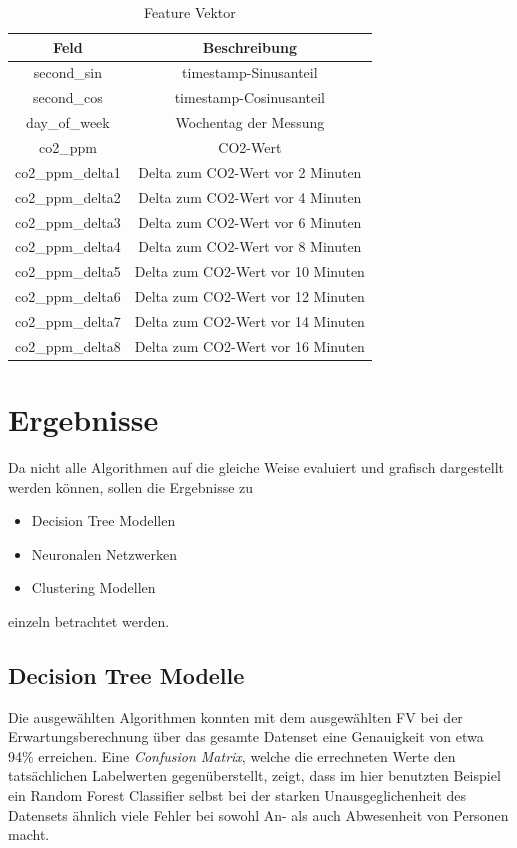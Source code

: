 \begin{center}
    \begin{table}[h]
        \centering
        \caption{Feature Vektor}
        \begin{tabular}{ |c||c| } 
        \hline
        Feld & Beschreibung \\ 
        \hline\hline
        second\_sin & timestamp-Sinusanteil\\
        second\_cos & timestamp-Cosinusanteil\\
        day\_of\_week & Wochentag der Messung\\
        co2\_ppm & CO2-Wert\\ 
        co2\_ppm\_delta1 & Delta zum CO2-Wert vor 2 Minuten\\ 
        co2\_ppm\_delta2 & Delta zum CO2-Wert vor 4 Minuten\\ 
        co2\_ppm\_delta3 & Delta zum CO2-Wert vor 6 Minuten\\ 
        co2\_ppm\_delta4 & Delta zum CO2-Wert vor 8 Minuten\\ 
        co2\_ppm\_delta5 & Delta zum CO2-Wert vor 10 Minuten\\ 
        co2\_ppm\_delta6 & Delta zum CO2-Wert vor 12 Minuten\\ 
        co2\_ppm\_delta7 & Delta zum CO2-Wert vor 14 Minuten\\ 
        co2\_ppm\_delta8 & Delta zum CO2-Wert vor 16 Minuten\\ 
        \hline
        \end{tabular}
    \end{table}
\end{center}

\newpage

\section{Ergebnisse}
Da nicht alle Algorithmen auf die gleiche Weise evaluiert und grafisch dargestellt werden können, sollen 
die Ergebnisse zu 
\begin{itemize}
    \item Decision Tree Modellen
    \item Neuronalen Netzwerken
    \item Clustering Modellen
\end{itemize}
einzeln betrachtet werden.

\subsection{Decision Tree Modelle}
Die ausgewählten Algorithmen konnten mit dem ausgewählten FV bei der Erwartungsberechnung über das gesamte 
Datenset eine Genauigkeit von etwa 94\% erreichen. Eine \textit{Confusion Matrix}, welche die errechneten 
Werte den tatsächlichen Labelwerten gegenüberstellt, zeigt, dass im hier benutzten Beispiel ein Random Forest Classifier 
selbst bei der starken Unausgeglichenheit des Datensets ähnlich viele Fehler bei sowohl An- als auch Abwesenheit 
von Personen macht.

